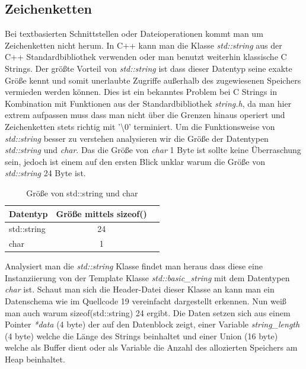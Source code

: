 \documentclass[MES,Master,ngerman]{twbook}%
\begin{document}
\subsection{Zeichenketten}
Bei textbasierten Schnittstellen oder Dateioperationen kommt man um Zeichenketten nicht herum. In C++ kann man die Klasse \textit{std::string} aus der C++ Standardbibliothek verwenden oder man benutzt weiterhin klassische C Strings. Der größte Vorteil von \textit{std::string} ist dass dieser Datentyp seine exakte Größe kennt und somit unerlaubte Zugriffe außerhalb des zugewiesenen Speichers vermieden werden können. Dies ist ein bekanntes Problem bei C Strings in Kombination mit Funktionen aus der Standardbibliothek \textit{string.h}, da man hier extrem aufpassen muss dass man nicht über die Grenzen hinaus operiert und Zeichenketten stets richtig mit '\textbackslash 0' terminiert. \newline\newline
Um die Funktionsweise von \textit{std::string} besser zu verstehen analysieren wir die Größe der Datentypen \textit{std::string} und \textit{char}. Das die Größe von \textit{char} 1 Byte ist sollte keine Überraschung sein, jedoch ist einem auf den ersten Blick unklar warum die Größe von \textit{std::string} 24 Byte ist.

\begin{table}[!htb]
	\centering
	\begin{tabular}{| l | c | r |}
		\hline
		\textbf{Datentyp}  & \textbf{Größe mittels sizeof()} \\ \hline
		std::string        & 24 \\ \hline
		char       		   & 1  \\ \hline
	\end{tabular}
	
	\caption{Größe von std::string und char}
	\label{tbl:size_string_char}
	
\end{table}

Analysiert man die \textit{std::string} Klasse findet man heraus dass diese eine Instanziierung von der Template Klasse \textit{std::basic\_string} mit dem Datentypen \textit{char} ist. Schaut man sich die Header-Datei dieser Klasse an kann man ein Datenschema wie im Quellcode 19 vereinfacht dargestellt erkennen. Nun weiß man auch warum sizeof(std::string) 24 ergibt. Die Daten setzen sich aus einem Pointer \textit{*data} (4 byte) der auf den Datenblock zeigt, einer Variable \textit{string\_length} (4 byte) welche die Länge des Strings beinhaltet und einer Union (16 byte) welche als Buffer dient oder als Variable die Anzahl des allozierten Speichers am Heap beinhaltet.\newline
\end{document}
